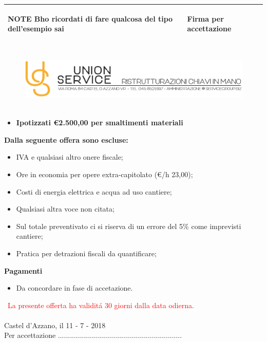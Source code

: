 \documentclass[a4paper]{article}
\begin{document}
  \vspace{19mm}


  \begin{center}
  \begin{tabular}{|L{105mm} | L{44mm}| }
  \hline
  \begin{spacing}{0.3}
    \textbf{NOTE} \newline
    \hfill
    Bho ricordati di fare qualcosa del tipo dell'esempio sai

  \end{spacing}&
  \begin{spacing}{0.3}
  \textbf{Firma per accettazione}
  \end{spacing}\\
  \hline
  \end{tabular}
  \end{center}

  \newpage

  \begin{figure}[!t]
  \includegraphics[width=15.8cm, height=3cm]{intestazioneAlta2.jpg}
  \end{figure}

  \begin{itemize}
      \item \textbf{Ipotizzati \euro 2.500,00 per smaltimenti materiali}
  \end{itemize}

  \noindent\textbf{Dalla seguente offera sono escluse:}
  \begin{itemize}
      \item IVA e qualsiasi altro onere fiscale;
      \item Ore in economia per opere extra-capitolato (\euro/h 23,00);
      \item Costi di energia elettrica e acqua ad uso cantiere;
      \item Qualsiasi altra voce non citata;
      \item Sul totale preventivato ci si riserva di un errore del 5\% come imprevisti cantiere;
      \item Pratica per detrazioni fiscali da quantificare;
  \end{itemize}

  \noindent\textbf{Pagamenti}
  \begin{itemize}
      \item Da concordare in fase di accetazione.
  \end{itemize}
  \
  \textcolor{red}{La presente offerta ha validit\'a 30 giorni dalla data odierna.}\\
  \\
  Castel d'Azzano, il 11 - 7 - 2018
  \vspace{1cm}\\
  Per accettazione ..............................................................
\end{document}
